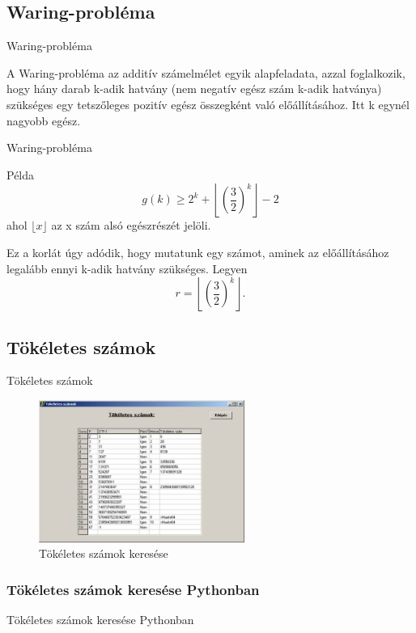\documentclass{beamer}
\theoremstyle{definition}
\begin{document}
\subsection{Waring-probléma}
\begin{frame}{Waring-probléma}

A Waring-probléma az additív számelmélet egyik alapfeladata, azzal foglalkozik, hogy hány darab k-adik hatvány (nem negatív egész szám k-adik hatványa) szükséges egy tetszőleges pozitív egész összegként való előállításához. Itt k egynél nagyobb egész. 
\end{frame}

\begin{frame}{Waring-probléma}

    \begin{center}\begin{exampleblock}{Példa}
            \[
g(k) \geq 2^{k} + \left\lfloor \left({\frac{3}{2}}\right)^{k} \right\rfloor - 2
\] ahol $\lfloor x \rfloor$ az x szám alsó egészrészét jelöli.

Ez a korlát úgy adódik, hogy mutatunk egy számot, aminek az előállításához legalább ennyi k-adik hatvány szükséges. Legyen
\[
r = \left\lfloor \left( \frac{3}{2} \right)^{k} \right\rfloor.
\]
        \end{exampleblock}
    \end{center}
\end{frame}
\subsection{Tökéletes számok}
\begin{frame}{Tökéletes számok}
    \begin{figure}
    \centering
    \includegraphics[width=0.6\textwidth]{tokeletesszamok.jpg}
    \caption{Tökéletes számok keresése}
\end{figure}
\end{frame}

\subsubsection{Tökéletes számok keresése Pythonban}
\begin{frame}{Tökéletes számok keresése Pythonban}
    
\end{frame}
\end{document}

